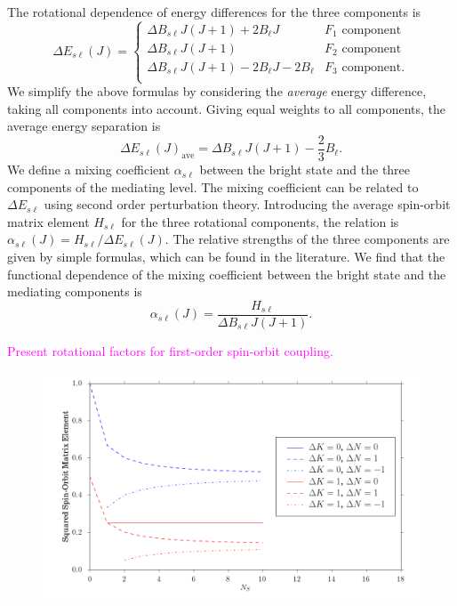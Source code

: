 \documentclass[12pt]{mitthesis}
\newcommand{\POINT}[1]{\textcolor{magenta}{#1}}
\begin{document}
The rotational dependence of energy differences for the three
components is
\begin{equation}
  \Delta E_{s\ell}(J) = 
  \begin{cases}
    \Delta B_{s\ell}J(J+1) + 2B_{\ell}J           & F_1 \text{ component}\\
    \Delta B_{s\ell}J(J+1)                      & F_2 \text{ component}\\
    \Delta B_{s\ell}J(J+1) - 2B_{\ell}J - 2B_{\ell} & F_3 \text{ component}.\\
  \end{cases}
\end{equation}
We simplify the above formulas by considering the \emph{average}
energy difference, taking all components into account.  Giving equal
weights to all components, the average energy separation is
\begin{equation}
  \Delta E_{s\ell}(J)_{\text{ave}} = \Delta B_{s\ell}J(J+1) - \frac{2}{3}B_{\ell}.
\end{equation}
We define a mixing coefficient $\alpha_{s\ell}$ between the bright
state and the three components of the mediating level.  The mixing
coefficient can be related to $\Delta E_{s\ell}$ using second order
perturbation theory.  Introducing the average spin-orbit matrix
element $H_{s\ell}$ for the three rotational components, the relation
is $\alpha_{s\ell}(J) = H_{s\ell} / \Delta E_{s\ell}(J)$.  The
relative strengths of the three components are given by simple
formulas, which can be found in the literature.  We find that the
functional dependence of the mixing coefficient between the bright
state and the mediating components is
\begin{equation}
  \alpha_{s\ell}(J) = \frac{H_{s\ell}}{\Delta B_{s\ell}J(J+1)}.
\end{equation}

\POINT{Present rotational factors for first-order spin-orbit
  coupling.}

\begin{figure}
  \caption{}
  \label{fig:rotational-factors-0}
  \centering
  \includegraphics[width=6in]{rotational_factors_k0.png}
\end{figure}
\end{document}
